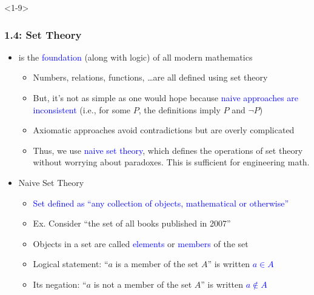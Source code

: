 \documentclass[10pt,english,aspectratio=169]{beamer}
\begin{document}
\begin{frame}<1-9> \frametitle{1.4: Set Theory}

\begin{itemize}
\setlength\itemsep{3mm}
\item<1-> is the \textcolor{blue}{foundation} (along with logic) of all modern mathematics \vspace{1mm}
\begin{itemize} 
  \setlength\itemsep{1.5mm}
  \item<2-> Numbers, relations, functions, \ldots are all defined using set theory
  \item<3-> But, it's not as simple as one would hope because \textcolor{blue}{naive approaches are inconsistent} (i.e., for some $P$, the definitions imply $P$ and $\neg P$)
  \item<4-> Axiomatic approaches avoid contradictions but are overly complicated
  \item<5-> Thus, we use \textcolor{blue}{naive set theory}, which defines the operations of set theory without worrying about paradoxes. This is sufficient for engineering math.
\end{itemize}

\item<6-> Naive Set Theory \vspace{1mm}
\begin{itemize} 
  \setlength\itemsep{1.5mm}
  \item<6-> \textcolor{blue}{Set defined as ``any collection of objects, mathematical or otherwise''}
  \item<6-> Ex. Consider ``the set of all books published in 2007''
  \item<7-> Objects in a set are called \textcolor{blue}{elements} or \textcolor{blue}{members} of the set
  \item<8-> Logical statement: ``$a$ is a member of the set $A$'' is written \textcolor{blue}{$a \in A$}
  \item<9-> Its negation: ``$a$ is not a member of the set $A$'' is written \textcolor{blue}{$a \notin A$}
\end{itemize}
\end{itemize}


\end{frame}
\end{document}
